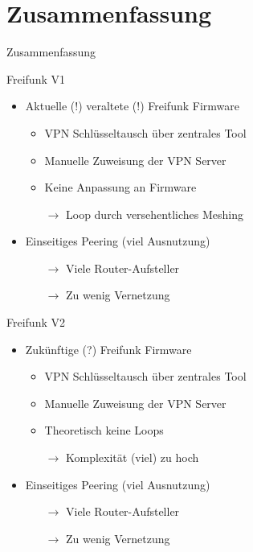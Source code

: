 \section{Zusammenfassung}
\begin{frame}{}
    \begin{center}
        Zusammenfassung
     \end{center}
\end{frame}

\begin{frame}{Freifunk V1}
    \begin{itemize}
        \item Aktuelle (!) veraltete (!) Freifunk Firmware
        \begin{itemize}
            \item VPN Schlüsseltausch über zentrales Tool
            \item Manuelle Zuweisung der VPN Server
            \item Keine Anpassung an Firmware
            \item[$\rightarrow$] Loop durch versehentliches Meshing
        \end{itemize}
        \item Einseitiges Peering (viel Ausnutzung)
        \begin{itemize}
            \item[$\rightarrow$] Viele Router-Aufsteller
            \item[$\rightarrow$] Zu wenig Vernetzung
        \end{itemize}
    \end{itemize}
\end{frame}

\begin{frame}{Freifunk V2}
    \begin{itemize}
        \item Zukünftige (?) Freifunk Firmware
        \begin{itemize}
            \item VPN Schlüsseltausch über zentrales Tool
            \item Manuelle Zuweisung der VPN Server
            \item Theoretisch keine Loops
            \item[$\rightarrow$] Komplexität (viel) zu hoch
        \end{itemize}
        \item Einseitiges Peering (viel Ausnutzung)
        \begin{itemize}
            \item[$\rightarrow$] Viele Router-Aufsteller
            \item[$\rightarrow$] Zu wenig Vernetzung
        \end{itemize}
    \end{itemize}
\end{frame}

